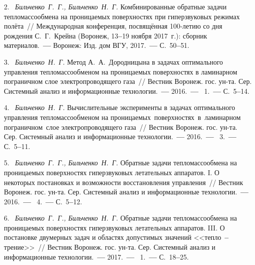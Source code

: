 2.~%
\textit{Бильченко~Г.~Г.,  Бильченко~Н.~Г.}\;
{%
  {Комбинированные  обратные  задачи
   тепломассообмена  на  проницаемых
   поверхностях  при  гиперзвуковых
   режимах  полёта}~/$\!$/
  Международная  конференция,  посвящённая
  100-летию
  со  дня  рождения
  С.~Г.~Крейна
  (Воронеж,
  13{\textbf{--}}19  ноября  2017~г.):
  сборник  материалов.~{\textbf{---}}
  Воронеж:  Изд.  дом  ВГУ,
  2017.~{\textbf{---}}
  С.~50{\textbf{--}}51.
}

3.~%
\textit{Бильченко~Н.~Г.}\;
{%
  {Метод  А.~А.~Дородницына
   в  задачах  оптимального  управления
    тепломассообменом  на  проницаемых  поверхностях
    в  ламинарном  пограничном  слое
    электропроводящего  газа}~/$\!$/
  Вестник  Воронеж.  гос.  ун-та.
  Сер.  Системный  анализ
  и  информационные  технологии.~{\textbf{---}}
  2016.~{\textbf{---}}
  \No~1.~{\textbf{---}}
  С.~5{\textbf{--}}14.
  }

4.~%
\textit{Бильченко~Н.~Г.}\;
{%
  {Вычислительные  эксперименты
    в  задачах  оптимального  управления  тепломассообменом
    на
    проницаемых\,  поверхностях\,
    в\,  ламинарном\,  пограничном\,  слое
    электропроводящего  газа}~/$\!$/
  Вестник  Воронеж.  гос.  ун-та.
  Сер.  Системный  анализ
  и  информационные  технологии.~{\textbf{---}}
  2016.~{\textbf{---}}
  \No~3.~{\textbf{---}}
  С.~5{\textbf{--}}11.
  }

5.~%
\textit{Бильченко~Г.~Г.,  Бильченко~Н.~Г.}\;
{%
  {Обратные  задачи  тепломассообмена
    на  проницаемых  поверхностях
    гиперзвуковых  летательных  аппаратов.
    I.  О  некоторых  постановках
    и  возможности  восстановления  управления}~/$\!$/
  Вестник  Воронеж.  гос.  ун-та.
  Сер.  Системный  анализ
  и  информационные  технологии.~{\textbf{---}}
  2016.~{\textbf{---}}
  \No~4.~{\textbf{---}}
  С.~5{\textbf{--}}12.
  }

6.~%
\textit{Бильченко~Г.~Г.,  Бильченко~Н.~Г.}\;
{%
  {Обратные  задачи  тепломассообмена
    на  проницаемых  поверхностях
    гиперзвуковых
    летательных  аппаратов.
    III.  О  постановке  двумерных  задач
    и  областях  допустимых  значений
    <<тепло~{\textbf{--}}  трение>>}~/$\!$/
  Вестник  Воронеж.  гос.  ун-та.
  Сер.  Системный  анализ
  и  информационные  технологии.~{\textbf{---}}
  2017.~{\textbf{---}}
  \No~1.~{\textbf{---}}
  С.~18{\textbf{--}}25.
  }

